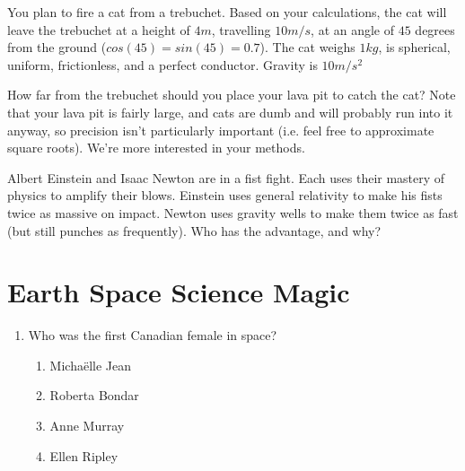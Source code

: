 \documentclass[11pt]{exam}
\begin{document}
\begin{questions}





\newpage
\question[10] You plan to fire a cat from a trebuchet. Based on your calculations, the cat
will leave the trebuchet at a height of $4m$, travelling $10m/s$, at an angle of
$45$ degrees from the ground ($cos(45) = sin(45) = 0.7$). The cat weighs $1kg$,
is spherical, uniform, frictionless, and a perfect conductor. Gravity is $10m/s^2$

How far from the trebuchet should you place your lava pit to catch the cat? Note
that your lava pit is fairly large, and cats are dumb and will probably run into
it anyway, so precision isn't particularly important (i.e. feel free to approximate square
roots). We're more interested in
your methods.







\newpage
\question[4] Albert Einstein and Isaac Newton are in a fist fight. Each uses their
mastery of physics to amplify their blows. Einstein uses general relativity to
make his fists twice as massive on impact. Newton uses gravity wells to make them twice as
fast (but still punches as frequently). Who has the advantage, and why?
\vfill






\newpage
\section{Earth Space Science Magic}

\begin{enumerate}


\item Who was the first Canadian female in space?

\begin{enumerate}
\item Michaëlle Jean
\item Roberta Bondar
\item Anne Murray
\item Ellen Ripley
\end{enumerate}


\end{enumerate}
\end{questions}
\end{document}
